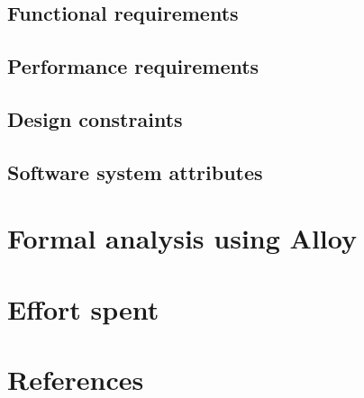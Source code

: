\documentclass{article}
\begin{document}
\subsection{Functional requirements}
\subsection{Performance requirements}
\subsection{Design constraints}
\subsection{Software system attributes}

\section{Formal analysis using Alloy}

\section{Effort spent}

\section{References}
\end{document}
